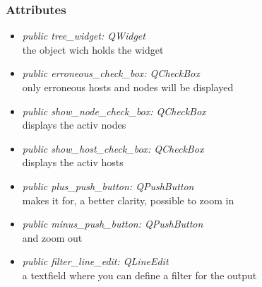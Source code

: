 \subsubsection{Attributes}
\begin{itemize}
  \item \textit{public tree\_widget: QWidget}\\
  the object wich holds the widget
  \item \textit{public erroneous\_check\_box: QCheckBox}\\
  only erroneous hosts and nodes will be displayed
  \item \textit{public show\_node\_check\_box: QCheckBox}\\
  displays the activ nodes
  \item \textit{public show\_host\_check\_box: QCheckBox}\\
  displays the activ hosts
  \item \textit{public plus\_push\_button: QPushButton}\\
  makes it for, a better clarity, possible to zoom in  
  \item \textit{public minus\_push\_button: QPushButton}\\
  and zoom out
  \item \textit{public filter\_line\_edit: QLineEdit}\\
  a textfield where you can define a filter for the output
\end{itemize}

